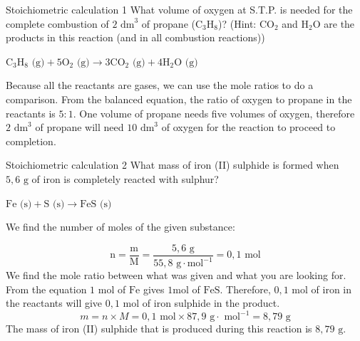       \begin{wex}{Stoichiometric calculation 1 }
{
What volume of oxygen at S.T.P. is needed for the complete combustion of $2 {\text{ dm}}^{3}$ of propane ($\text{C}{}_{3}\text{H}{}_{8}$)? (Hint: $\text{CO}{}_{2}$ and $\text{H}{}_{2}\text{O}$ are the products in this reaction (and in all combustion reactions))
      }
{
${\text{C}}_{3}{\text{H}}_{8} \text{ (g)} + 5{\text{O}}_{2} \text{ (g)} \to 3\text{C}{\text{O}}_{2} \text{ (g)} + 4{\text{H}}_{2}\text{O} \text{ (g)}$
       
Because all the reactants are gases, we can use the mole ratios to do a comparison. From the balanced equation, the ratio of oxygen to propane in the reactants is $5:1$.
      \label{m38712*id284304}One volume of propane needs five volumes of oxygen, therefore $2 {\text{ dm}}^{3}$ of propane will need $10 {\text{ dm}}^{3}$ of oxygen for the reaction to proceed to completion. 
}
    \end{wex}
    \noindent
\label{m38712*secfhsst!!!underscore!!!id1972} 
      \begin{wex}{Stoichiometric calculation 2 }
{
      \label{m38712*probfhsst!!!underscore!!!id1973}
      \label{m38712*id284347}What mass of iron (II) sulphide is formed when $5,6 \text{ g}$ of iron is completely reacted with sulphur?
      }
{
      \label{m38712*id284378}$\text{Fe} \text{ (s)} + \text{S} \text{ (s)} \to \text{FeS} \text{ (s)}$
       
       We find the number of moles of the given substance:  
      \label{m38712*id284430}\nopagebreak\noindent{}
        
    \begin{equation*}
    \text{n}=\frac{\text{m}}{\text{M}}=\frac{5,6 \text{ g}}{55,8 \text{ g} \cdot \text{mol}^{-1}} = 0,1\text{ mol}
      \end{equation*}
       We find the mole ratio between what was given and what you are looking for. From the equation $1 \text{ mol}$ of $\text{Fe}$ gives $1 \text{mol}$ of $\text{FeS}$. Therefore, $0,1\text{ mol}$ of iron in the reactants will give $0,1 \text{ mol}$ of iron sulphide in the product. 
      \label{m38712*id284499}\nopagebreak\noindent{}
    \begin{equation*}
    m=n \times M = 0,1 \text{ mol} \times 87,9 \text{ g} \cdot \text{ mol}^{-1} = 8,79 \text{ g}
      \end{equation*}
      \label{m38712*id284548}The mass of iron (II) sulphide that is produced during this reaction is $8,79 \text{ g}$. 
}
    \end{wex}
    \noindent
